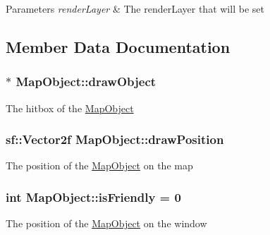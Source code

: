 \begin{DoxyParams}{Parameters}
{\em render\+Layer} & The render\+Layer that will be set \\
\hline
\end{DoxyParams}


\subsection{Member Data Documentation}
\hypertarget{class_map_object_a1c65f2eeb4aa3ce941e5a91347441aa9}{}
\subsubsection[{draw\+Object}]{$\ast$ Map\+Object\+::draw\+Object\hspace{0.3cm}{\ttfamily [protected]}}\label{class_map_object_a1c65f2eeb4aa3ce941e5a91347441aa9}
The hitbox of the \hyperlink{class_map_object}{Map\+Object} \hypertarget{class_map_object_a3f383fa967b67989a1d30f8f9ff73936}{}
\subsubsection[{draw\+Position}]{\setlength{\rightskip}{0pt plus 5cm}sf\+::\+Vector2f Map\+Object\+::draw\+Position\hspace{0.3cm}{\ttfamily [protected]}}\label{class_map_object_a3f383fa967b67989a1d30f8f9ff73936}
The position of the \hyperlink{class_map_object}{Map\+Object} on the map \hypertarget{class_map_object_a1788c8bf4e3c04bff8c2eba112e46d79}{}
\subsubsection[{is\+Friendly}]{\setlength{\rightskip}{0pt plus 5cm}int Map\+Object\+::is\+Friendly = 0\hspace{0.3cm}{\ttfamily [protected]}}\label{class_map_object_a1788c8bf4e3c04bff8c2eba112e46d79}
The position of the \hyperlink{class_map_object}{Map\+Object} on the window \hypertarget{class_map_object_a00491cbf8e4cbc729ef37e11f3473860}{}
